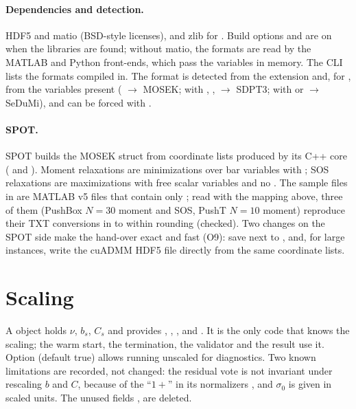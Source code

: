 \documentclass[11pt]{article}
\begin{document}
\paragraph{Dependencies and detection.} HDF5 and matio (BSD-style licenses), and zlib for . Build options
 and  are on when the libraries are found; without matio, the
 formats are read by the MATLAB and Python front-ends, which pass the variables in memory. The CLI lists
the formats compiled in. The format is detected from the extension and, for , from the variables
present ( $\to$ MOSEK;  with , ,  $\to$ SDPT3;  with  or
 $\to$ SeDuMi), and can be forced with .

\paragraph{SPOT.} SPOT builds the MOSEK  struct from coordinate lists produced by its C++ core
( and ). Moment relaxations are minimizations over bar variables with
; SOS relaxations are maximizations with free scalar variables and no . The sample files in
 are MATLAB v5 files that contain only ; read with the mapping above, three
of them (PushBox $N=30$ moment and SOS, PushT $N=10$ moment) reproduce their TXT conversions in
 to within rounding (checked). Two changes on the SPOT side make
the hand-over exact and fast (O9): save  next to , and, for large instances, write the cuADMM
HDF5 file directly from the same coordinate lists.

\section{Scaling}\label{sec:scaling}
A  object holds $\nu$, $b_s$, $C_s$ and provides , ,
,  and . It is the only code that
knows the scaling; the warm start, the termination, the validator and the result use it. Option
 (default true) allows running unscaled for diagnostics. Two known limitations are
recorded, not changed: the residual vote is not invariant under rescaling $b$ and $C$, because of the ``$1+$''
in its normalizers \cite{wohlberg2017,sigmastudy}, and $\sigma_0$ is given in scaled units. The unused fields
,  are deleted.
\end{document}
